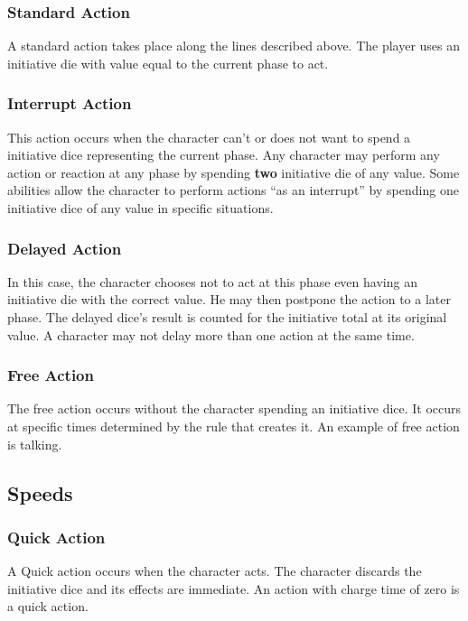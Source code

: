 \begin{multicols}{2}
\subsubsection{Standard Action}
A standard action takes place along the lines described above. The player uses an initiative die with value equal to the current phase to act.

\subsubsection{Interrupt Action}
This action occurs when the character can't or does not want to spend a initiative dice representing the current phase. Any character may perform any action or reaction at any phase by spending \textbf{two} initiative die of any value. Some abilities allow the character to perform actions “as an interrupt” by spending one initiative dice of any value in specific situations.

\subsubsection{Delayed Action}
In this case, the character chooses not to act at this phase even having an initiative die with the correct value. He may then postpone the action to a later phase. The delayed dice’s result is counted for the initiative total at its original value. A character may not delay more than one action at the same time.

\subsubsection{Free Action}
The free action occurs without the character spending an initiative dice. It occurs at specific times determined by the rule that creates it. An example of free action is talking.

\subsection{Speeds}\label{subsec:speeds}
\subsubsection{Quick Action}
A Quick action occurs when the character acts. The character discards the initiative dice and its effects are immediate. An action with charge time of zero is a quick action.


\end{multicols}
